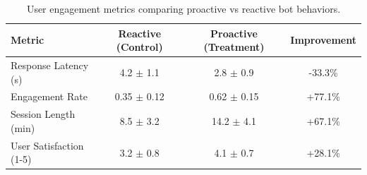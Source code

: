 \begin{table}[t]
\centering
\caption{User engagement metrics comparing proactive vs reactive bot behaviors.}
\label{tab:engagement}
\begin{tabular}{lccc}
\toprule
Metric & Reactive (Control) & Proactive (Treatment) & Improvement \\
\midrule
Response Latency (s) & 4.2 $\pm$ 1.1 & 2.8 $\pm$ 0.9 & -33.3\% \\
Engagement Rate & 0.35 $\pm$ 0.12 & 0.62 $\pm$ 0.15 & +77.1\% \\
Session Length (min) & 8.5 $\pm$ 3.2 & 14.2 $\pm$ 4.1 & +67.1\% \\
User Satisfaction (1-5) & 3.2 $\pm$ 0.8 & 4.1 $\pm$ 0.7 & +28.1\% \\
\bottomrule
\end{tabular}
\end{table}